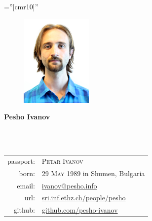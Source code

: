 \documentclass[a4paper,10pt]{article}
\def\name{Pesho Ivanov}
\newcommand{\minorcolor}[1]{\textcolor{mygray}{#1}}
\begin{document}
\pagestyle{empty}                               %
\font\fb=''[cmr10]''                            %


\begin{figure}
          \vspace{-35pt}\includegraphics[width=35mm]{PetarIvanov2015.jpg}
\end{figure}

\par{\raggedright\Huge\textbf{\vspace{-3mm}\hspace{0mm}\name}}\\        %
\vspace{-5mm}{\color{linegray}\rule{10.5cm}{0.1mm}}\\

\hspace{4mm}\begin{tabular}{rl}
        \minorcolor{passport:} & \textsc{Petar Ivanov}\\
        \minorcolor{born:} & \textsc{29 May 1989} in Shumen, Bulgaria\\
        \minorcolor{email:} & \href{mailto:ivanov@pesho.info}{ivanov@pesho.info}\\
        \minorcolor{url:} & \href{https://www.sri.inf.ethz.ch/people/pesho}{sri.inf.ethz.ch/people/pesho}\\
        \minorcolor{github:} & \href{https://github.com/pesho-ivanov/}{github.com/pesho-ivanov}\\
\end{tabular}
\bigskip
\end{document}
